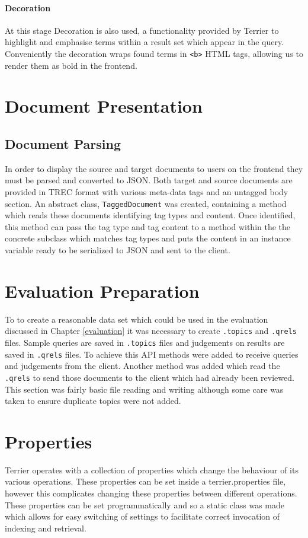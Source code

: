 \documentclass{l4proj}
\newcommand{\code}[1]{\texttt{#1}}
\begin{document}
\paragraph{Decoration} \label{server_decoration}
At this stage Decoration is also used, a functionality provided by Terrier to highlight and emphasise terms within a result set which appear in the query. Conveniently the decoration wraps found terms in \code{<b>} HTML tags, allowing us to render them as bold in the frontend.

\section{Document Presentation}
\subsection{Document Parsing} \label{docparse}
In order to display the source and target documents to users on the frontend they must be parsed and converted to JSON.
Both target and source documents are provided in TREC format with various meta-data tags and an untagged body section.
An abstract class, \code{TaggedDocument} was created, containing a method which reads these documents identifying tag types and content. Once identified, this method can pass the tag type and tag content to a method within the the concrete subclass which matches tag types and puts the content in an instance variable ready to be serialized to JSON and sent to the client.

\section{Evaluation Preparation}
To to create a reasonable data set which could be used in the evaluation discussed in Chapter \ref{evaluation} it was necessary to create \code{.topics} and \code{.qrels} files. Sample queries are saved in \code{.topics} files and judgements on results are saved in \code{.qrels} files.
To achieve this API methods were added to receive queries and judgements from the client. Another method was added which read the \code{.qrels} to send those documents to the client which had already been reviewed.
This section was fairly basic file reading and writing although some care was taken to ensure duplicate topics were not added.

\section{Properties}
Terrier operates with a collection of properties which change the behaviour of its various operations. These properties can be set inside a terrier.properties file, however this complicates changing these properties between different operations. These properties can be set programmatically and so a static class was made which allows for easy switching of settings to facilitate correct invocation of indexing and retrieval.
\end{document}
